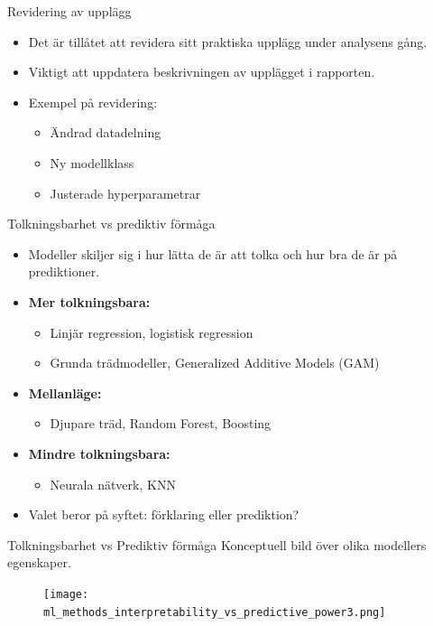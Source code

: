 \documentclass[10pt,english]{beamer}
\begin{document}
\begin{frame}{Revidering av upplägg}
\begin{itemize}
    \item Det är tillåtet att revidera sitt praktiska upplägg under analysens gång. 
    \item Viktigt att uppdatera beskrivningen av upplägget i rapporten.
    \item Exempel på revidering:
    \begin{itemize}
        \item Ändrad datadelning
        \item Ny modellklass
        \item Justerade hyperparametrar
    \end{itemize}
\end{itemize}
\end{frame}


\begin{frame}{Tolkningsbarhet vs prediktiv förmåga}
\begin{itemize}
    \item Modeller skiljer sig i hur lätta de är att tolka och hur bra de är på prediktioner.
    \item \textbf{Mer tolkningsbara:}
    \begin{itemize}
        \item Linjär regression, logistisk regression
        \item Grunda trädmodeller, Generalized Additive Models (GAM)
    \end{itemize}
    \item \textbf{Mellanläge:}
    \begin{itemize}
        \item Djupare träd, Random Forest, Boosting
    \end{itemize}
    \item \textbf{Mindre tolkningsbara:}
    \begin{itemize}
        \item Neurala nätverk, KNN
    \end{itemize}
    \item Valet beror på syftet: förklaring eller prediktion?
\end{itemize}
\end{frame}

\begin{frame}{Tolkningsbarhet vs Prediktiv förmåga}
Konceptuell bild över olika modellers egenskaper.
\begin{figure}
    \centering
    \texttt{[image: ml\_methods\_interpretability\_vs\_predictive\_power3.png]}
\end{figure}
\end{frame}
\end{document}
